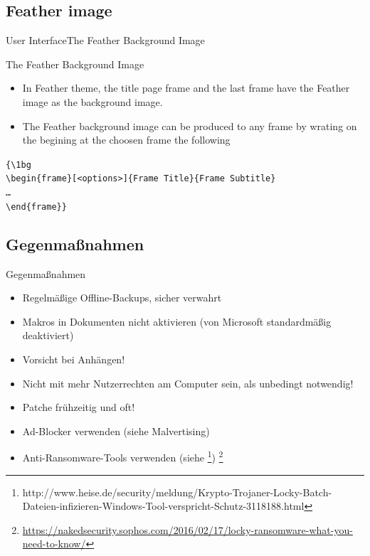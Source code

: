 \documentclass[notes,10pt]{beamer}
\begin{document}
\subsection{Feather image}
\begin{frame}{User Interface}{The Feather Background Image}

\begin{block}{The Feather Background Image}
    \begin{itemize}
    \item In Feather theme, the title page frame and the last frame have the Feather image as the background image. 
    \item The Feather background image can be produced to any frame by wrating on the begining at the choosen frame the following
    \end{itemize} 
    
    \vspace{5pt} 
    
  {\tt \{\textbackslash 1bg\\
    \textbackslash begin\{frame\}[<options>]\{Frame Title\}\{Frame Subtitle\}\\
    \ldots\\
    \textbackslash end\{frame\}\}}
\end{block}
\end{frame}


\subsection{Gegenmaßnahmen}
\begin{frame}{Gegenmaßnahmen}
	\begin{itemize}
		\item Regelmäßige Offline-Backups, sicher verwahrt
		\item Makros in Dokumenten nicht aktivieren (von Microsoft standardmäßig deaktiviert)
		\item Vorsicht bei Anhängen!
		\item Nicht mit mehr Nutzerrechten am Computer sein, als unbedingt notwendig!
		\item Patche frühzeitig und oft!
		\item Ad-Blocker verwenden (siehe Malvertising)
		\item Anti-Ransomware-Tools verwenden (siehe \footnote{http://www.heise.de/security/meldung/Krypto-Trojaner-Locky-Batch-Dateien-infizieren-Windows-Tool-verspricht-Schutz-3118188.html})
		\let\thefootnote\relax\footnote{\url{https://nakedsecurity.sophos.com/2016/02/17/locky-ransomware-what-you-need-to-know/}}
 	\end{itemize}

\end{frame}
\end{document}
